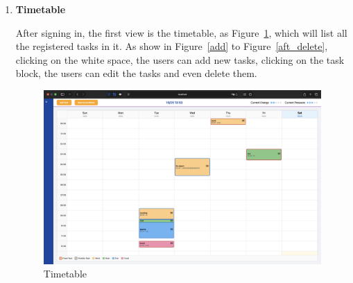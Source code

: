 \documentclass[12pt, a4paper]{article}
\begin{document}
\begin{enumerate}
                \item \textbf{Timetable} 

                    After signing in, the first view is the timetable, as Figure~\ref{timetable}, which will list all the registered tasks in it. As show in Figure~\ref{add} to Figure~\ref{aft_delete}, clicking on the white space, the users can add new tasks, clicking on the task block, the users can edit the tasks and even delete them. 

                    \begin{figure}[H]
                        \centering
                        \includegraphics[width=\textwidth]{Images/System/timetable/timetable.png}
                        \caption{Timetable}
                        \label{timetable}
                    \end{figure}


\end{enumerate}
\end{document}
